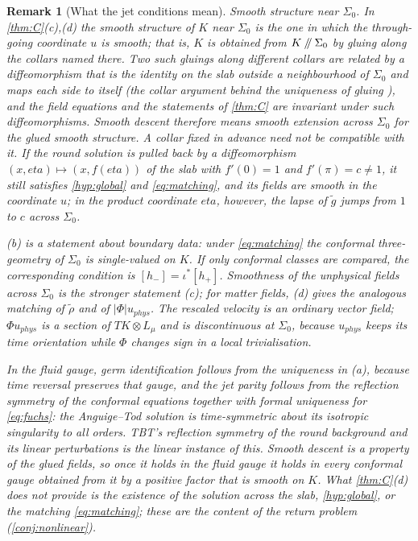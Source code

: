 \documentclass[11pt]{article}
\theoremstyle{canonmath}
\newtheorem{remark}[theorem]{Remark}
\theoremstyle{canonpostulate}
\theoremstyle{canonproposition}
\theoremstyle{canonmath}
\theoremstyle{canonproposition}
\providecommand{\cutK}{\Klein\mathbin{/\mkern-5mu/}\Sigma_0}
\providecommand{\Lmu}{\mathcal{L}_\mu}
\providecommand{\Klein}{\mathcal{K}}
\def\mathrm#1{#1}%
\def\mathcal#1{#1}%
\def\eta{eta}%
\begin{document}
\begin{remark}[What the jet conditions mean]\label{rem:even}
\emph{Smooth structure near $\Sigma_0$.} In \cref{thm:C}(c),(d) the smooth structure of $\Klein$ near $\Sigma_0$ is the one in which the through-going coordinate $u$ is smooth; that is, $\Klein$ is obtained from $\cutK$ by gluing along the collars named there. Two such gluings along different collars are related by a diffeomorphism that is the identity on the slab outside a neighbourhood of $\Sigma_0$ and maps each side to itself (the collar argument behind the uniqueness of gluing \cite[\S\S8.1--8.2]{Hirsch1976}), and the field equations and the statements of \cref{thm:C} are invariant under such diffeomorphisms. Smooth descent therefore means smooth extension across $\Sigma_0$ for the glued smooth structure. A collar fixed in advance need not be compatible with it. If the round solution is pulled back by a diffeomorphism $(x,\eta)\mapsto(x,f(\eta))$ of the slab with $f'(0) = 1$ and $f'(\pi) = c\neq1$, it still satisfies \ref{hyp:global} and \eqref{eq:matching}, and its fields are smooth in the coordinate $u$; in the product coordinate $\eta$, however, the lapse of $\tilde g$ jumps from $1$ to $c$ across $\Sigma_0$.

(b) is a statement about boundary data: under \eqref{eq:matching} the conformal three-geometry of $\Sigma_0$ is single-valued on $\Klein$. If only conformal classes are compared, the corresponding condition is $[h_-] = \iota^*[h_+]$. Smoothness of the unphysical fields across $\Sigma_0$ is the stronger statement (c); for matter fields, (d) gives the analogous matching of $\tilde\rho$ and of $|\Phi|u_{\mathrm{phys}}$. The rescaled velocity is an ordinary vector field; $\Phi u_{\mathrm{phys}}$ is a section of $T\Klein\otimes\Lmu$ and is discontinuous at $\Sigma_0$, because $u_{\mathrm{phys}}$ keeps its time orientation while $\Phi$ changes sign in a local trivialisation.

In the fluid gauge, germ identification follows from the uniqueness in (a), because time reversal preserves that gauge, and the jet parity follows from the reflection symmetry of the conformal equations together with formal uniqueness for \eqref{eq:fuchs}: the Anguige--Tod solution is time-symmetric about its isotropic singularity to all orders. TBT's reflection symmetry of the round background and its linear perturbations is the linear instance of this. Smooth descent is a property of the glued fields, so once it holds in the fluid gauge it holds in every conformal gauge obtained from it by a positive factor that is smooth on $\Klein$. What \cref{thm:C}(d) does not provide is the existence of the solution across the slab, \ref{hyp:global}, or the matching \eqref{eq:matching}; these are the content of the return problem (\cref{conj:nonlinear}).
\end{remark}
\end{document}
